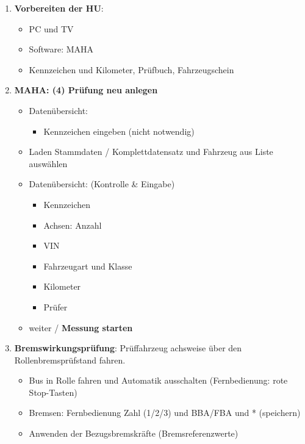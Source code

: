 \documentclass{vorlage-design-main}
\begin{document}
\begin{enumerate}
\def\labelenumi{\arabic{enumi}.}
\item
  \textbf{Vorbereiten der HU}:

  \begin{itemize}

  \item
    PC und TV
  \item
    Software: MAHA
  \item
    Kennzeichen und Kilometer, Prüfbuch, Fahrzeugschein
  \end{itemize}
\item
  \textbf{MAHA: (4) Prüfung neu anlegen}

  \begin{itemize}

  \item
    Datenübersicht:

    \begin{itemize}

    \item
      Kennzeichen eingeben (nicht notwendig)
    \end{itemize}
  \item
    Laden Stammdaten / Komplettdatensatz und Fahrzeug aus Liste
    auswählen
  \item
    Datenübersicht: (Kontrolle \& Eingabe)

    \begin{itemize}

    \item
      Kennzeichen
    \item
      Achsen: Anzahl
    \item
      VIN
    \item
      Fahrzeugart und Klasse
    \item
      Kilometer
    \item
      Prüfer
    \end{itemize}
  \item
    weiter / \textbf{Messung starten}
  \end{itemize}
\item
  \textbf{Bremswirkungsprüfung}: Prüffahrzeug achsweise über den
  Rollenbremsprüfstand fahren.

  \begin{itemize}

  \item
    Bus in Rolle fahren und Automatik ausschalten (Fernbedienung: rote
    Stop-Tasten)
  \item
    Bremsen: Fernbedienung Zahl (1/2/3) und BBA/FBA und * (speichern)
  \item
    Anwenden der Bezugsbremskräfte (Bremsreferenzwerte)


\end{itemize}
\end{enumerate}
\end{document}
